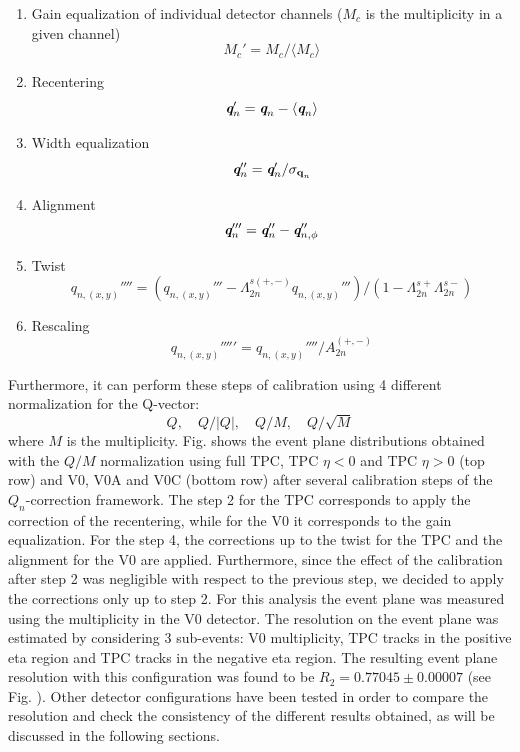 \begin{enumerate}
\item Gain equalization of individual detector channels ($M_c$ is the
  multiplicity in a given channel)
\begin{equation}
M_c' = M_c / \langle M_c \rangle
\end{equation}
\item Recentering
\begin{equation}
\emph{\textbf{q}}_n' = \emph{\textbf{q}}_n - \langle \emph{\textbf{q}}_n \rangle
\end{equation}
\item Width equalization
\begin{equation}
\emph{\textbf{q}}_n'' = \emph{\textbf{q}}_n' / \sigma_{\textbf{q}_n}
\end{equation}
\item Alignment
\begin{equation}
\emph{\textbf{q}}_n''' = \emph{\textbf{q}}_n'' - \emph{\textbf{q}}_{n,\phi}''
\end{equation}
\item Twist
\begin{equation}
q_{n,(x,y)}'''' = (q_{n,(x,y)}'''-\Lambda_{2n}^{s (+,-)}q_{n,(x,y)}''')/(1-\Lambda_{2n}^{s+}\Lambda_{2n}^{s-})
\end{equation}
\item Rescaling
\begin{equation}
q_{n,(x,y)}''''' = q_{n,(x,y)}''''/A_{2n}^{(+,-)}
\end{equation}
\end{enumerate}
Furthermore, it can perform these steps of calibration using 4 different normalization for the Q-vector:
\begin{equation}
Q, \quad Q/|Q|, \quad Q/M, \quad Q/\sqrt{M}
\end{equation}
where $M$ is the multiplicity.
Fig.  shows the event plane
distributions obtained with the $Q/M$ normalization using 
full TPC, TPC $\eta<0$ and TPC $\eta>0$ (top row) and V0, 
V0A and V0C (bottom row) after several calibration steps of 
the $Q_n$-correction framework. The step 2 for the TPC  
corresponds to apply the correction of the recentering, while 
for the V0 it corresponds to the gain equalization. For the 
step 4, the corrections up to the twist for the TPC and the 
alignment for the V0 are applied. Furthermore, since the 
effect of the calibration after step 2 was negligible with 
respect to the previous step, we decided to apply the 
corrections only up to step 2.
For this analysis the event plane was measured using 
the multiplicity in the V0 detector. The resolution on the 
event plane was estimated by considering 3 sub-events: 
V0 multiplicity, TPC tracks in the positive eta region and 
TPC tracks in the negative eta region. The resulting event 
plane resolution with this configuration was found to be 
$R_2 = 0.77045 \pm 0.00007$ (see Fig. ). Other detector 
configurations have been tested in order to compare
 the resolution and check the consistency of the different
  results obtained, as will be discussed in the following sections.


